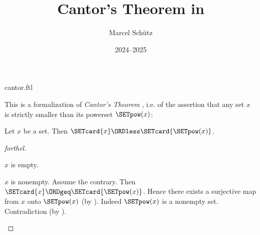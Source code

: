\documentclass{stex}
\title{Cantor's Theorem in \Naproche}
\author{Marcel Schütz}
\date{2024--2025}
\begin{document}
\begin{smodule}{cantor.ftl}
\maketitle


\noindent This is a formalization of \emph{Cantor's Theorem}
\cite{Cantor1891}, i.e. of the assertion that any set $x$ is strictly smaller
than its powerset $\SETpow(x)$:

\begin{theorem}[forthel,title=Cantor's Theorem,id=cantor_389275382172394]
  Let $x$ be a set.
  Then $\SETcard{x} \ORDless \SETcard{\SETpow(x)}$.
\end{theorem}
\begin{proof}[forthel]
  \begin{case}{$x$ is empty.} \end{case}

  \begin{case}{$x$ is nonempty.}
    Assume the contrary.
    Then $\SETcard{x} \ORDgeq \SETcard{\SETpow(x)}$.
    Hence there exists a surjective map from $x$ onto $\SETpow(x)$ (by ).
    Indeed $\SETpow(x)$ is a nonempty set.
    Contradiction (by ).
  \end{case}
\end{proof}

\printbibliography
{}
\end{smodule}
\end{document}

